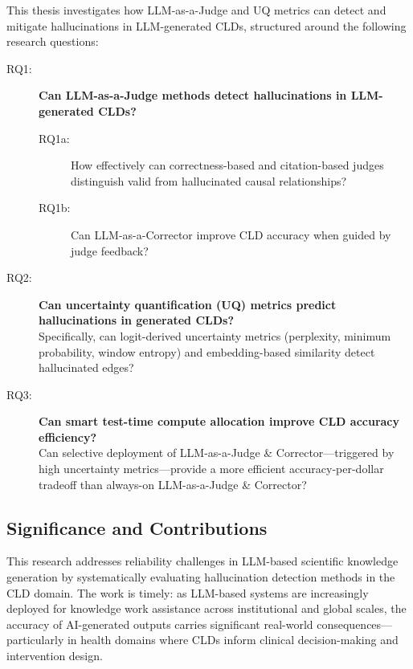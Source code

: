 This thesis investigates how LLM-as-a-Judge and UQ metrics can detect and mitigate hallucinations in LLM-generated CLDs, structured around the following research questions:

\begin{description}
    \item[RQ1:] \textbf{Can LLM-as-a-Judge methods detect hallucinations in LLM-generated CLDs?}
    \begin{description}
        \item[RQ1a:] How effectively can correctness-based and citation-based judges distinguish valid from hallucinated causal relationships?
        \item[RQ1b:] Can LLM-as-a-Corrector improve CLD accuracy when guided by judge feedback?
    \end{description}
    
    \item[RQ2:] \textbf{Can uncertainty quantification (UQ) metrics predict hallucinations in generated CLDs?}\\
    Specifically, can logit-derived uncertainty metrics (perplexity, minimum probability, window entropy) and embedding-based similarity detect hallucinated edges?
    
    \item[RQ3:] \textbf{Can smart test-time compute allocation improve CLD accuracy efficiency?}\\
    Can selective deployment of LLM-as-a-Judge \& Corrector---triggered by high uncertainty metrics---provide a more efficient accuracy-per-dollar tradeoff than always-on LLM-as-a-Judge \& Corrector?
\end{description}

\subsection*{Significance and Contributions}

This research addresses reliability challenges in LLM-based scientific knowledge generation by systematically evaluating hallucination detection methods in the CLD domain. The work is timely: as LLM-based systems are increasingly deployed for knowledge work assistance across institutional and global scales, the accuracy of AI-generated outputs carries significant real-world consequences---particularly in health domains where CLDs inform clinical decision-making and intervention design.

